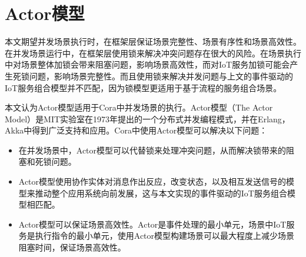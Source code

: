 \documentclass[winfonts,master,twoside]{njuthesis}
\begin{document}


\section{Actor模型}
本文期望并发场景执行时，在框架层保证场景完整性、场景有序性和场景高效性。在并发场景运行中，在框架层使用锁来解决冲突问题存在很大的风险。在场景执行中对场景整体加锁会带来阻塞问题，影响场景高效性，而对IoT服务加锁可能会产生死锁问题，影响场景完整性\cite{salvaneschi2012contexterlang}。而且使用锁来解决并发问题与上文的事件驱动的IoT服务组合模型并不匹配，因为锁模型更适用于基于流程的服务组合场景。

本文认为Actor模型适用于Cora中并发场景的执行。Actor模型（The Actor Model）\cite{agha1985actors}是MIT实验室在1973年提出的一个分布式并发编程模式，并在Erlang\cite{armstrong2010erlang}，Akka\cite{vernon2015reactive}中得到广泛支持和应用。Cora中使用Actor模型可以解决以下问题：
\begin{itemize}
    \item 在并发场景中，Actor模型可以代替锁来处理冲突问题，从而解决锁带来的阻塞和死锁问题。
    \item Actor模型使用协作实体对消息作出反应，改变状态，以及相互发送信号的模型来推动整个应用系统向前发展，这与本文实现的事件驱动的IoT服务组合模型相匹配。
    \item Actor模型可以保证场景高效性。Actor是事件处理的最小单元，场景中IoT服务是执行指令的最小单元，使用Actor模型构建场景可以最大程度上减少场景阻塞时间，保证场景高效性。
\end{itemize}
\end{document}
